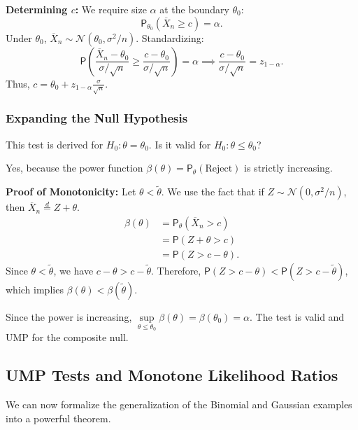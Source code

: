 \begin{ex}
\textbf{Determining $c$:}
We require size $\alpha$ at the boundary $\theta_0$:
\[ \mathsf{P}_{\theta_0}(\overline{X}_n \ge c) = \alpha. \]
Under $\theta_0$, $\overline{X}_n \sim \mathcal{N}(\theta_0, \sigma^2/n)$. Standardizing:
\[ \mathsf{P}\left( \frac{\overline{X}_n - \theta_0}{\sigma/\sqrt{n}} \ge \frac{c - \theta_0}{\sigma/\sqrt{n}} \right) = \alpha \implies \frac{c - \theta_0}{\sigma/\sqrt{n}} = z_{1-\alpha}. \]
Thus, $c = \theta_0 + z_{1-\alpha} \frac{\sigma}{\sqrt{n}}$.



\subsubsection{Expanding the Null Hypothesis}
This test is derived for $H_0: \theta = \theta_0$.
Is it valid for $H_0: \theta \le \theta_0$?

Yes, because the power function $\beta(\theta) = \mathsf{P}_\theta(\text{Reject})$ is strictly increasing.

\textbf{Proof of Monotonicity:}
Let $\theta < \tilde{\theta}$. We use the fact that if $Z \sim \mathcal{N}(0, \sigma^2/n)$, then $\overline{X}_n \stackrel{d}{=} Z + \theta$.
\[
\begin{split} 
\beta(\theta) &= \mathsf{P}_{\theta}(\overline{X}_n > c) \\
&= \mathsf{P}(Z + \theta > c) \\
&= \mathsf{P}(Z > c - \theta).
\end{split}
\]
Since $\theta < \tilde{\theta}$, we have $c - \theta > c - \tilde{\theta}$.
Therefore, $\mathsf{P}(Z > c - \theta) < \mathsf{P}(Z > c - \tilde{\theta})$, which implies $\beta(\theta) < \beta(\tilde{\theta})$.

Since the power is increasing, $\sup\limits_{\theta \le \theta_0} \beta(\theta) = \beta(\theta_0) = \alpha$. The test is valid and UMP for the composite null.
\end{ex}

\subsection{UMP Tests and Monotone Likelihood Ratios}
\label{sec:ump_mlr_theorem}

We can now formalize the generalization of the Binomial and Gaussian examples into a powerful theorem.

